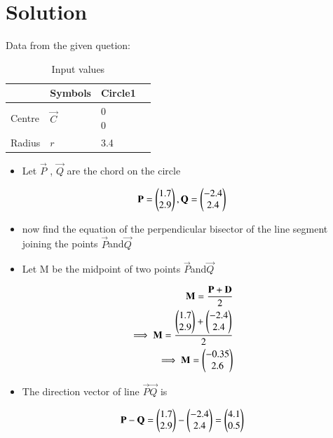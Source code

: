 \documentclass[journal,12pt,twocolumn]{IEEEtran}
\begin{document}
\section{Solution}
Data from the given quetion:
\begin{table}[!ht]
\begin{center}
\begin{tabular}{ | m{2cm} | m{1.5cm}| m{2cm} | m{1.5cm} |} 
\hline
& Symbols & Circle1  \\
\hline
Centre & $\vec{C}$ & \myvec{0\\0}  \\ 
\hline
Radius & $r$& 3.4 \\ 
\hline
\end{tabular}
\end{center}
\caption{Input values}
\label{tab:table1}
\end{table}
\begin{itemize}
    \item Let $\Vec{P}$ , $\Vec{Q}$ are the chord on the circle
\end{itemize}
\begin{align}
      \mathbf{P} = \begin{pmatrix}1.7\\2.9\end{pmatrix},\mathbf{Q} = \begin{pmatrix}-2.4\\2.4\end{pmatrix}
 \end{align}
\begin{itemize}
    \item now find the equation of the perpendicular bisector of the line segment joining the points $\vec{P}$and$\vec{Q}$
\end{itemize}
\begin{itemize}
    \item Let M be the midpoint of two points $\vec{P}$and$\vec{Q}$
\end{itemize}
\begin{align}
    \mathbf{M}=\frac{\mathbf{P}+\mathbf{D}}{2}
    \\
   \implies \mathbf{M}=\frac{\begin{pmatrix}1.7\\2.9\end{pmatrix}+\begin{pmatrix}-2.4\\2.4\end{pmatrix}}{2}
    \\
    \implies\mathbf{M}=\begin{pmatrix}-0.35\\2.6\end{pmatrix}
\end{align}
\begin{itemize}
    \item The direction vector of line $\vec{P}$$\vec{Q}$ is
\end{itemize}
\begin{align}
 \Vec{P} -\vec{Q}=  \myvec{1.7\\2.9}-\myvec{-2.4\\2.4}=\myvec{4.1\\0.5}
\end{align}
\end{document}
